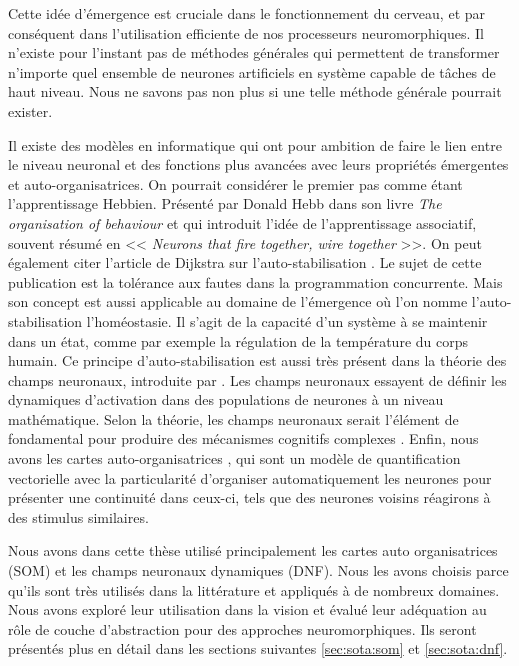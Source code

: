 	Cette idée d'émergence est cruciale dans le fonctionnement du cerveau, et par conséquent dans l'utilisation efficiente de nos processeurs neuromorphiques. Il n'existe pour l'instant pas de méthodes générales qui permettent de transformer n'importe quel ensemble de neurones artificiels en système capable de tâches de haut niveau. Nous ne savons pas non plus si une telle méthode générale pourrait exister.

	Il existe des modèles en informatique qui ont pour ambition de faire le lien entre le niveau neuronal et des fonctions plus avancées avec leurs propriétés émergentes et auto-organisatrices. On pourrait considérer le premier pas comme étant l'apprentissage Hebbien. Présenté par Donald Hebb dans son livre \textit{The organisation of behaviour} \cite{hebb1949organisation} et qui introduit l'idée de l'apprentissage associatif, souvent résumé en << \textit{Neurons that fire together, wire together} >>. On peut également citer l'article de Dijkstra sur l'auto-stabilisation \cite{dijkstra1982self}. Le sujet de cette publication est la tolérance aux fautes dans la programmation concurrente. Mais son concept est aussi applicable au domaine de l'émergence où l'on nomme l'auto-stabilisation l'homéostasie. Il s'agit de la capacité d'un système à se maintenir dans un état, comme par exemple la régulation de la température du corps humain. Ce principe d'auto-stabilisation est aussi très présent dans la théorie des champs neuronaux, introduite par \cite{amari1977dynamics}. Les champs neuronaux essayent de définir les dynamiques d'activation dans des populations de neurones à un niveau mathématique. Selon la théorie, les champs neuronaux serait l'élément de fondamental pour produire des mécanismes cognitifs complexes \cite{sandamirskaya2014dynamic}. Enfin, nous avons les cartes auto-organisatrices \cite{kohonen-som82}, qui sont un modèle de quantification vectorielle avec la particularité d'organiser automatiquement les neurones pour présenter une continuité dans ceux-ci, tels que des neurones voisins réagirons à des stimulus similaires.

	Nous avons dans cette thèse utilisé principalement les cartes auto organisatrices (SOM) et les champs neuronaux dynamiques (DNF). Nous les avons choisis parce qu'ils sont très utilisés dans la littérature et appliqués à de nombreux domaines. Nous avons exploré leur utilisation dans la vision et évalué leur adéquation au rôle de couche d'abstraction pour des approches neuromorphiques. Ils seront présentés plus en détail dans les sections suivantes \ref{sec:sota:som} et \ref{sec:sota:dnf}.

